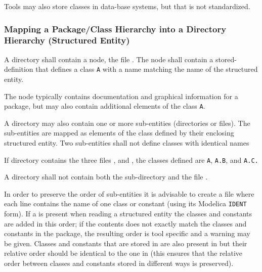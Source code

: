 \begin{nonnormative}
Tools may also store classes in data-base systems, but that is not standardized.
\end{nonnormative}

\subsubsection{Mapping a Package/Class Hierarchy into a Directory Hierarchy (Structured Entity)}\label{mapping-a-package-class-hierarchy-into-a-directory-hierarchy-structured-entity}

A directory shall contain a node, the file . The node shall contain a stored-definition that defines a class \lstinline!A! with a name
matching the name of the structured entity.

\begin{nonnormative}
The node typically contains documentation and graphical information for a package, but may also contain additional elements of the class \lstinline!A!.
\end{nonnormative}

A directory may also contain one or more sub-entities (directories or
files). The sub-entities are mapped as elements of the class defined by
their enclosing structured entity.  Two sub-entities shall not define classes with identical names

\begin{example}
If directory  contains the three files ,  and , the classes defined are \lstinline!A!,
\lstinline!A.B!, and \lstinline!A.C.!
\end{example}

\begin{example}
A directory shall not contain both the sub-directory  and the file .
\end{example}

In order to preserve the order of sub-entities it is advisable to create
a file  where each line contains the name of one class or
constant (using its Modelica \lstinline!IDENT! form). If a  is present when reading a structured entity
the classes and constants are added in this order; if the contents does
not exactly match the classes and constants in the package, the
resulting order is tool specific and a warning may be given. Classes and
constants that are stored in  are also present in
 but their relative order should be identical to the one in
 (this ensures that the relative order between classes and
constants stored in different ways is preserved).

